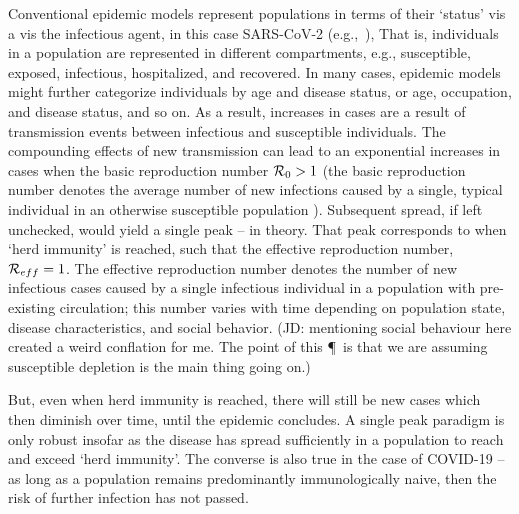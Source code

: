Conventional epidemic
models represent populations in terms of their `status' vis
a vis the infectious agent, in this case 
SARS-CoV-2 (e.g.,~\citep{ferguson2020report,kucharski2020early,kissler_medrxiv2020,park_medrxiv2020,kraemer_2020sci,li_science2020,wu2020estimating}),
That is, individuals
in a population are represented in different compartments, e.g.,
susceptible, exposed, infectious,
hospitalized, and recovered.  In many cases, epidemic models
might further categorize individuals by age and disease status, or age, occupation,
and disease status, and so on.  As a result, increases in cases
are a result of transmission events between infectious
and susceptible individuals.  The compounding effects 
of new transmission can lead to an exponential increases in cases 
when the basic reproduction number ${\cal{R}}_0>1$ (the
basic reproduction number denotes the average number of new
infections caused by a single, typical individual in an otherwise
susceptible population \citep{anderson1991infectious}).  Subsequent
spread, if left unchecked, would yield a single peak -- in theory. That 
peak corresponds to when `herd immunity' is reached, such
that the effective reproduction number, ${\cal{R}}_{eff}=1$.
The effective reproduction number denotes the number of new
infectious cases caused by a single infectious individual
in a population with pre-existing circulation; this number varies with
time depending on population state, disease characteristics, and 
social behavior.
(JD: mentioning social behaviour here created a weird conflation for me. The point of this \P\ is that we are assuming susceptible depletion is the main thing going on.)

But, even when herd immunity is reached, there will still be new cases which then
diminish over time, until the epidemic concludes.  
A single peak paradigm is
only robust insofar as the disease has spread
sufficiently in a population to reach and exceed `herd immunity'.
The converse
is also true in the case of COVID-19 -- as long as 
a population remains predominantly immunologically
naive, then the risk of further infection has not passed. 

